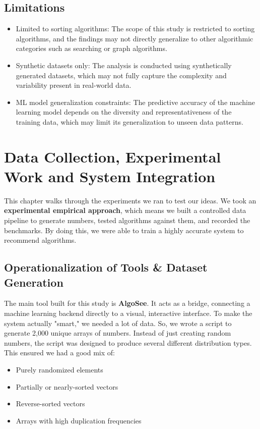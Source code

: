 \documentclass[12pt,a4paper,oneside,openany]{report}
\begin{document}
\section{Limitations}
\begin{itemize}
\item Limited to sorting algorithms:
The scope of this study is restricted to sorting algorithms, and the findings may not directly generalize to other algorithmic categories such as searching or graph algorithms.
\item Synthetic datasets only:
The analysis is conducted using synthetically generated datasets, which may not fully capture the complexity and variability present in real-world data.
\item ML model generalization constraints:
The predictive accuracy of the machine learning model depends on the diversity and representativeness of the training data, which may limit its generalization to unseen data patterns.
\end{itemize}
\clearpage
\chapter{Data Collection, Experimental Work and System Integration}

This chapter walks through the experiments we ran to test our ideas. We took an \textbf{experimental empirical approach}, which means we built a controlled data pipeline to generate numbers, tested algorithms against them, and recorded the benchmarks. By doing this, we were able to train a highly accurate system to recommend algorithms.

\section{Operationalization of Tools \& Dataset Generation}
The main tool built for this study is \textbf{AlgoSee}. It acts as a bridge, connecting a machine learning backend directly to a visual, interactive interface. 
To make the system actually "smart," we needed a lot of data. So, we wrote a script to generate 2,000 unique arrays of numbers. Instead of just creating random numbers, the script was designed to produce several different distribution types. This ensured we had a good mix of:
\begin{itemize}
    \item Purely randomized elements
    \item Partially or nearly-sorted vectors
    \item Reverse-sorted vectors
    \item Arrays with high duplication frequencies
\end{itemize}
\end{document}

